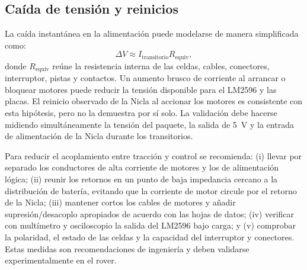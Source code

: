 \documentclass[conference]{IEEEtran}
\begin{document}
\subsection{Caída de tensión y reinicios}
La caída instantánea en la alimentación puede modelarse de manera simplificada como:
\begin{equation}
\Delta V\approx I_{\mathrm{transitorio}}R_{\mathrm{equiv}},
\end{equation}
donde \(R_{\mathrm{equiv}}\) reúne la resistencia interna de las celdas, cables, conectores, interruptor, pistas y contactos. Un aumento brusco de corriente al arrancar o bloquear motores puede reducir la tensión disponible para el LM2596 y las placas. El reinicio observado de la Nicla al accionar los motores es consistente con esta hipótesis, pero no la demuestra por sí solo. La validación debe hacerse midiendo simultáneamente la tensión del paquete, la salida de \SI{5}{V} y la entrada de alimentación de la Nicla durante los transitorios.

Para reducir el acoplamiento entre tracción y control se recomienda: (i) llevar por separado los conductores de alta corriente de motores y los de alimentación lógica; (ii) reunir los retornos en un punto de baja impedancia cercano a la distribución de batería, evitando que la corriente de motor circule por el retorno de la Nicla; (iii) mantener cortos los cables de motores y añadir supresión/desacoplo apropiados de acuerdo con las hojas de datos; (iv) verificar con multímetro y osciloscopio la salida del LM2596 bajo carga; y (v) comprobar la polaridad, el estado de las celdas y la capacidad del interruptor y conectores. Estas medidas son recomendaciones de ingeniería y deben validarse experimentalmente en el rover.
\end{document}
